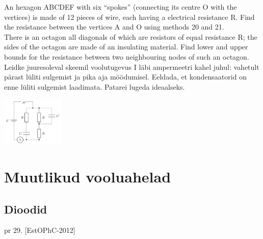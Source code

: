 \documentclass{article}
\begin{document}
An hexagon ABCDEF with six “spokes” (connecting its centre O with the vertices) is made of 12 pieces of
wire, each having a electrical resistance R. Find the resistance
between the vertices A and O using methods 20 and 21.\\
There is an octagon all diagonals of which are resistors of equal resistance R; the sides of the octagon are made
of an insulating material. Find lower and upper bounds for the
resistance between two neighbouring nodes of such an octagon.
Leidke juuresoleval skeemil voolutugevus I läbi ampermeetri kahel juhul: vahetult pärast lüliti sulgemist ja pika aja möödumisel. Eeldada, et kondensaatorid on
enne lüliti sulgemist laadimata. Patarei lugeda ideaalseks.\\
\begin{center}
\includegraphics[width =  3cm]{cap2.PNG}
\end{center}
\section{Muutlikud vooluahelad}
\subsection{Dioodid}
pr 29. [EstOPhC-2012]
\end{document}
